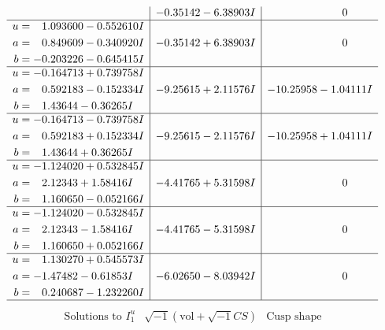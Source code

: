 \documentclass[1p]{elsarticle_modified}
\theoremstyle{definition}
\newcommand{\I}{\sqrt{-1}}
\begin{document}
$$\begin{array}{c|c|c}
 & -0.35142 - 6.38903 I & \phantom{-0.000000 } 0 \\ \hline\begin{aligned}
u &= \phantom{-}1.093600 - 0.552610 I \\
a &= \phantom{-}0.849609 - 0.340920 I \\
b &= -0.203226 - 0.645415 I\end{aligned}
 & -0.35142 + 6.38903 I & \phantom{-0.000000 } 0 \\ \hline\begin{aligned}
u &= -0.164713 + 0.739758 I \\
a &= \phantom{-}0.592183 - 0.152334 I \\
b &= \phantom{-}1.43644 - 0.36265 I\end{aligned}
 & -9.25615 + 2.11576 I & -10.25958 - 1.04111 I \\ \hline\begin{aligned}
u &= -0.164713 - 0.739758 I \\
a &= \phantom{-}0.592183 + 0.152334 I \\
b &= \phantom{-}1.43644 + 0.36265 I\end{aligned}
 & -9.25615 - 2.11576 I & -10.25958 + 1.04111 I \\ \hline\begin{aligned}
u &= -1.124020 + 0.532845 I \\
a &= \phantom{-}2.12343 + 1.58416 I \\
b &= \phantom{-}1.160650 - 0.052166 I\end{aligned}
 & -4.41765 + 5.31598 I & \phantom{-0.000000 } 0 \\ \hline\begin{aligned}
u &= -1.124020 - 0.532845 I \\
a &= \phantom{-}2.12343 - 1.58416 I \\
b &= \phantom{-}1.160650 + 0.052166 I\end{aligned}
 & -4.41765 - 5.31598 I & \phantom{-0.000000 } 0 \\ \hline\begin{aligned}
u &= \phantom{-}1.130270 + 0.545573 I \\
a &= -1.47482 - 0.61853 I \\
b &= \phantom{-}0.240687 - 1.232260 I\end{aligned}
 & -6.02650 - 8.03942 I & \phantom{-0.000000 } 0\\
 \hline 
 \end{array}$$\newpage$$\begin{array}{c|c|c}  
\text{Solutions to }I^u_{1}& \I (\text{vol} + \sqrt{-1}CS) & \text{Cusp shape}\\

\end{array}$$
\end{document}
